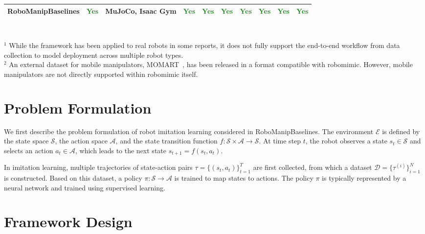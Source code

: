 \documentclass[letterpaper, 10 pt, conference]{ieeeconf}  %
\newcommand{\yesmark}{\textcolor{ForestGreen}{Yes}}
\newcommand{\nomark}{\textcolor{BrickRed}{No}}
\newcommand{\partialmark}{\textcolor{Orange}{Partial}}
\begin{document}
\begin{table}[tb]
{\begin{tabular}{lccccccccc}
      \textbf{RoboManipBaselines} & \yesmark & MuJoCo, Isaac Gym & \yesmark & \yesmark & \yesmark & \yesmark & \yesmark & \yesmark & \yesmark \\
      \bottomrule
    \end{tabular}
  }
  \\
  \vspace{3mm}
  \begin{adjustwidth}{10pt}{0pt}
    \raggedright
    $^1$ While the framework has been applied to real robots in some reports, it does not fully support the end-to-end workflow from data collection to model deployment across multiple robot types.\\
    $^2$ An external dataset for mobile manipulators, MOMART~\cite{MOMART:Wong:CoRL2022}, has been released in a format compatible with robomimic. However, mobile manipulators are not directly supported within robomimic itself.
  \end{adjustwidth}
\end{table}


\section{Problem Formulation}

We first describe the problem formulation of robot imitation learning considered in RoboManipBaselines.
The environment $\mathcal{E}$ is defined by the state space $\mathcal{S}$, the action space $\mathcal{A}$, and the state transition function $f : \mathcal{S} \times \mathcal{A} \to \mathcal{S}$.
At time step $t$, the robot observes a state $s_t \in \mathcal{S}$ and selects an action $a_t \in \mathcal{A}$, which leads to the next state $s_{t+1} = f(s_t, a_t)$.

In imitation learning, multiple trajectories of state-action pairs $\tau = \{(s_t, a_t)\}_{t=1}^{T}$ are first collected, from which a dataset $\mathcal{D} = \{\tau^{(i)}\}_{i=1}^{N}$ is constructed.
Based on this dataset, a policy $\pi : \mathcal{S} \to \mathcal{A}$ is trained to map states to actions.
The policy $\pi$ is typically represented by a neural network and trained using supervised learning.

\section{Framework Design}
\end{document}
